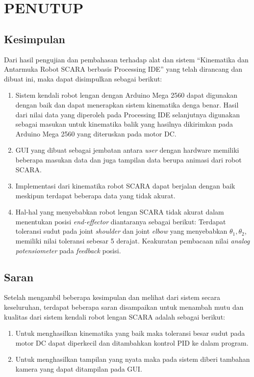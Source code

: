 
\chapter{PENUTUP}
\section{Kesimpulan}
Dari hasil pengujian dan pembahasan terhadap alat dan sistem “Kinematika dan Antarmuka Robot SCARA berbasis Processing IDE” yang telah dirancang dan dibuat ini, maka dapat disimpulkan sebagai berikut:
\begin{enumerate}
	\item Sistem kendali robot lengan dengan Arduino Mega 2560 dapat digunakan dengan baik dan dapat menerapkan sistem kinematika denga benar. Hasil dari nilai data yang diperoleh pada Processing IDE selanjutnya digunakan sebagai masukan untuk kinematika balik yang hasilnya dikirimkan pada Arduino Mega 2560 yang diteruskan pada motor DC.
	\item GUI yang dibuat sebagai jembatan antara \textit{user} dengan hardware memiliki beberapa masukan data dan juga tampilan data berupa animasi dari robot SCARA.
	\item Implementasi dari kinematika robot SCARA dapat berjalan dengan baik meskipun terdapat beberapa data yang tidak akurat. 
	\item  Hal-hal yang menyebabkan robot lengan SCARA  tidak akurat dalam menentukan posisi \textit{end-effector} diantaranya sebagai berikut:
	\subitem   Terdapat toleransi sudut pada joint \textit{shoulder} dan joint \textit{elbow} yang menyebabkan $\theta_{1}, \theta_{2}$, memiliki nilai toleransi sebesar 5 derajat. 
	\subitem  Keakuratan  pembacaan nilai \textit{analog potensiometer} pada \textit{feedback} posisi. 
\end{enumerate}
\section{Saran}
Setelah mengambil beberapa kesimpulan dan melihat dari sistem secara keseluruhan, terdapat beberapa saran disampaikan untuk menambah mutu dan kualitas dari sistem kendali robot lengan SCARA adalah sebagai berikut: 
\begin{enumerate}
	\item Untuk menghasilkan kinematika yang baik maka toleransi besar sudut pada motor DC dapat diperkecil dan ditambahkan kontrol PID ke dalam program.
	\item Untuk menghasilkan tampilan yang nyata maka pada sistem diberi tambahan kamera yang dapat ditampilan pada GUI.
\end{enumerate}